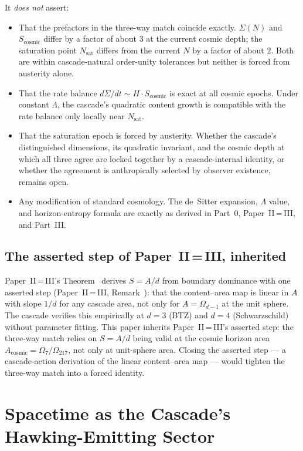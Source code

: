 \documentclass[11pt,a4paper]{article}
\begin{document}
It \emph{does not} assert:
\begin{itemize}
\item That the prefactors in the three-way match coincide exactly.
$\Sigma(N)$ and $S_{\mathrm{cosmic}}$ differ by a factor of about
$3$ at the current cosmic depth; the saturation point
$N_{\mathrm{sat}}$ differs from the current $N$ by a factor of
about $2$. Both are within cascade-natural order-unity tolerances
but neither is forced from austerity alone.
\item That the rate balance $d\Sigma/dt \sim H \cdot
S_{\mathrm{cosmic}}$ is exact at all cosmic epochs. Under constant
$\Lambda$, the cascade's quadratic content growth is compatible with
the rate balance only locally near $N_{\mathrm{sat}}$.
\item That the saturation epoch is forced by austerity. Whether the
cascade's distinguished dimensions, its quadratic invariant, and
the cosmic depth at which all three agree are locked together by a
cascade-internal identity, or whether the agreement is anthropically
selected by observer existence, remains open.
\item Any modification of standard cosmology. The de~Sitter
expansion, $\Lambda$ value, and horizon-entropy formula are exactly
as derived in Part~0, Paper~II\,=\,III, and Part~III.
\end{itemize}

\subsection*{The asserted step of Paper~II\,=\,III, inherited}

Paper~II\,=\,III's Theorem~ derives
$S = A/d$ from boundary dominance with one asserted step
(Paper~II\,=\,III, Remark~): that the
content--area map is linear in $A$ with slope $1/d$ for any cascade
area, not only for $A = \Omega_{d-1}$ at the unit sphere. The cascade
verifies this empirically at $d = 3$ (BTZ) and $d = 4$ (Schwarzschild)
without parameter fitting. This paper inherits Paper~II\,=\,III's
asserted step: the three-way match relies on $S = A/d$ being valid
at the cosmic horizon area $A_{\mathrm{cosmic}} = \Omega_7/\Omega_{217}$,
not only at unit-sphere area. Closing the asserted step ---
a cascade-action derivation of the linear content--area
map --- would tighten the three-way match into a forced identity.

\section{Spacetime as the Cascade's Hawking-Emitting Sector}\label{sec:hawking-analog}
\end{document}
